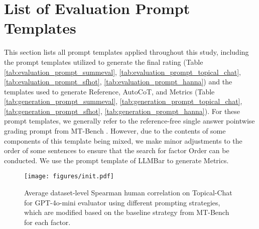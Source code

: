 \section{List of Evaluation Prompt Templates}
\label{appendix:prompt_template}
This section lists all prompt templates applied throughout this study, including the prompt templates utilized to generate the final rating (Table \ref{tab:evaluation_prompt_summeval}, \ref{tab:evaluation_prompt_topical_chat}, \ref{tab:evaluation_prompt_sfhot}, \ref{tab:evaluation_prompt_hanna}) and the templates used to generate Reference, AutoCoT, and Metrics (Table \ref{tab:generation_prompt_summeval}, \ref{tab:generation_prompt_topical_chat}, \ref{tab:generation_prompt_sfhot}, \ref{tab:generation_prompt_hanna}). 
For these prompt templates, 
we generally refer to the reference-free single answer pointwise grading prompt from MT-Bench \cite{zheng2023judging}. 
However, due to the contents of some components of this template 
being mixed, we make minor adjustments to the order of some sentences to ensure that the search for factor Order can be conducted.
We use the prompt template of LLMBar \cite{zeng2024llmbar} to generate Metrics.


\begin{figure*}[!t]
  \centering
  \texttt{[image: figures/init.pdf]}
  \vspace{-2mm}
  \caption{Average dataset-level Spearman human correlation on Topical-Chat for GPT-4o-mini evaluator using different prompting strategies, which are modified based on the baseline strategy from MT-Bench for each factor.}
  \vspace{-4mm}
  \label{fig:init}
\end{figure*}

